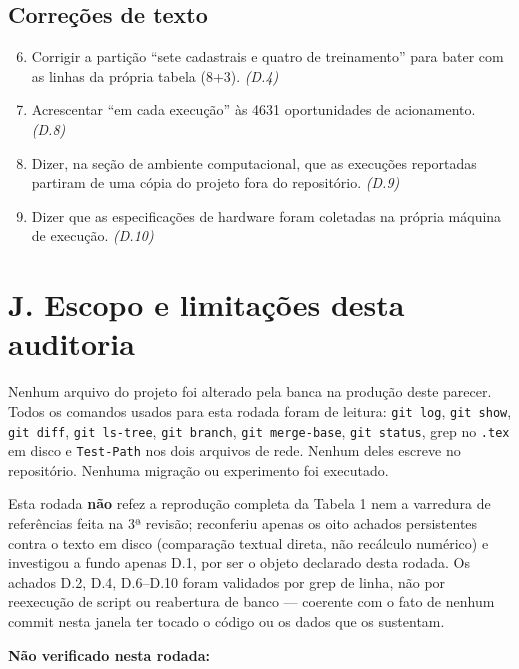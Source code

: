 \documentclass[11pt,a4paper]{article}
\begin{document}
\subsection*{Correções de texto}

\begin{enumerate}\setcounter{enumi}{5}
  \item Corrigir a partição ``sete cadastrais e quatro de treinamento'' para bater com as linhas da
  própria tabela (8+3). \emph{(D.4)}
  \item Acrescentar ``em cada execução'' às 4631 oportunidades de acionamento. \emph{(D.8)}
  \item Dizer, na seção de ambiente computacional, que as execuções reportadas partiram de uma cópia
  do projeto fora do repositório. \emph{(D.9)}
  \item Dizer que as especificações de hardware foram coletadas na própria máquina de execução.
  \emph{(D.10)}
\end{enumerate}

\section*{J. Escopo e limitações desta auditoria}

Nenhum arquivo do projeto foi alterado pela banca na produção deste parecer. Todos os comandos usados
para esta rodada foram de leitura: \texttt{git log}, \texttt{git show}, \texttt{git diff}, \texttt{git
ls-tree}, \texttt{git branch}, \texttt{git merge-base}, \texttt{git status}, grep no \texttt{.tex} em
disco e \texttt{Test-Path} nos dois arquivos de rede. Nenhum deles escreve no repositório. Nenhuma
migração ou experimento foi executado.

Esta rodada \textbf{não} refez a reprodução completa da Tabela 1 nem a varredura de referências feita
na 3ª revisão; reconferiu apenas os oito achados persistentes contra o texto em disco (comparação
textual direta, não recálculo numérico) e investigou a fundo apenas D.1, por ser o objeto declarado
desta rodada. Os achados D.2, D.4, D.6--D.10 foram validados por grep de linha, não por reexecução de
script ou reabertura de banco --- coerente com o fato de nenhum commit nesta janela ter tocado o
código ou os dados que os sustentam.

\textbf{Não verificado nesta rodada:}
\end{document}

